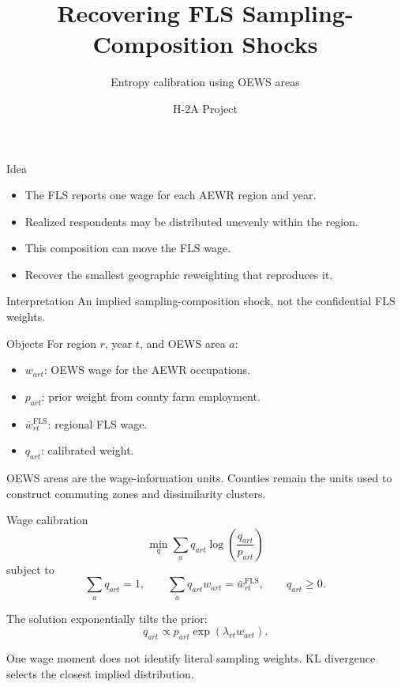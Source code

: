 \documentclass[aspectratio=169,11pt]{beamer}
\title{Recovering FLS Sampling-Composition Shocks}
\subtitle{Entropy calibration using OEWS areas}
\author{H-2A Project}
\date{}
\newcommand{\FLS}{\mathrm{FLS}}
\begin{document}
\begin{frame}
  \titlepage
\end{frame}

\begin{frame}{Idea}
  \begin{itemize}
    \item The FLS reports one wage for each AEWR region and year.
    \item Realized respondents may be distributed unevenly within the region.
    \item This composition can move the FLS wage.
    \item Recover the smallest geographic reweighting that reproduces it.
  \end{itemize}

  \begin{block}{Interpretation}
    An implied sampling-composition shock, not the confidential FLS weights.
  \end{block}
\end{frame}

\begin{frame}{Objects}
  For region $r$, year $t$, and OEWS area $a$:

  \begin{itemize}
    \item $w_{art}$: OEWS wage for the AEWR occupations.
    \item $p_{art}$: prior weight from county farm employment.
    \item $\bar w^{\FLS}_{rt}$: regional FLS wage.
    \item $q_{art}$: calibrated weight.
  \end{itemize}

  OEWS areas are the wage-information units. Counties remain the units used to
  construct commuting zones and dissimilarity clusters.
\end{frame}

\begin{frame}{Wage calibration}
  \[
    \min_q \sum_a q_{art}\log\left(\frac{q_{art}}{p_{art}}\right)
  \]
  subject to
  \[
    \sum_a q_{art}=1,
    \qquad
    \sum_a q_{art}w_{art}=\bar w^{\FLS}_{rt},
    \qquad
    q_{art}\geq0.
  \]

  The solution exponentially tilts the prior:
  \[
    q_{art}\propto p_{art}\exp(\lambda_{rt}w_{art}).
  \]

  One wage moment does not identify literal sampling weights. KL divergence
  selects the closest implied distribution.
\end{frame}
\end{document}
